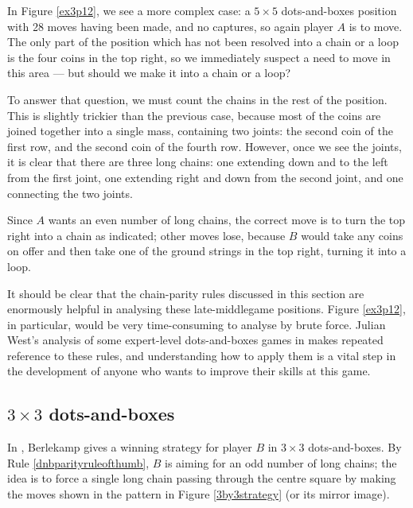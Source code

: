 \documentclass[a4paper,twocolumn]{article}
\begin{document}
In Figure \ref{ex3p12}, we see a more complex case: a $5 \times 5$
dots-and-boxes position with 28 moves having been made, and no
captures, so again player $A$ is to move. The only part of the
position which has not been resolved into a chain or a loop is the
four coins in the top right, so we immediately suspect a need to move
in this area --- but should we make it into a chain or a loop?

\begin{figure*}
  \centering
  \def\svgscale{0.7}
  
  \caption{Exercise 3.12 from \cite{berl}: $A$ to move, solution highlighted}
  \label{ex3p12}
\end{figure*}

To answer that question, we must count the chains in the rest of the
position. This is slightly trickier than the previous case, because
most of the coins are joined together into a single mass, containing
two joints: the second coin of the first row, and the second coin of
the fourth row. However, once we see the joints, it is clear that
there are three long chains: one extending down and to the left from
the first joint, one extending right and down from the second joint,
and one connecting the two joints.

Since $A$ wants an even number of long chains, the correct move is to
turn the top right into a chain as indicated; other moves lose,
because $B$ would take any coins on offer and then take one of the
ground strings in the top right, turning it into a loop.

It should be clear that the chain-parity rules discussed in this
section are enormously helpful in analysing these late-middlegame
positions. Figure \ref{ex3p12}, in particular, would be very
time-consuming to analyse by brute force. Julian West's analysis of
some expert-level dots-and-boxes games in \cite{nochance} makes
repeated reference to these rules, and understanding how to apply them
is a vital step in the development of anyone who wants to improve
their skills at this game.

\subsection{$3 \times 3$ dots-and-boxes}

In \cite{berl}, Berlekamp gives a winning strategy for player $B$ in
$3 \times 3$ dots-and-boxes. By Rule \ref{dnbparityruleofthumb}, $B$
is aiming for an odd number of long chains; the idea is to force a
single long chain passing through the centre square by making the
moves shown in the pattern in Figure \ref{3by3strategy} (or its mirror
image).
\end{document}
